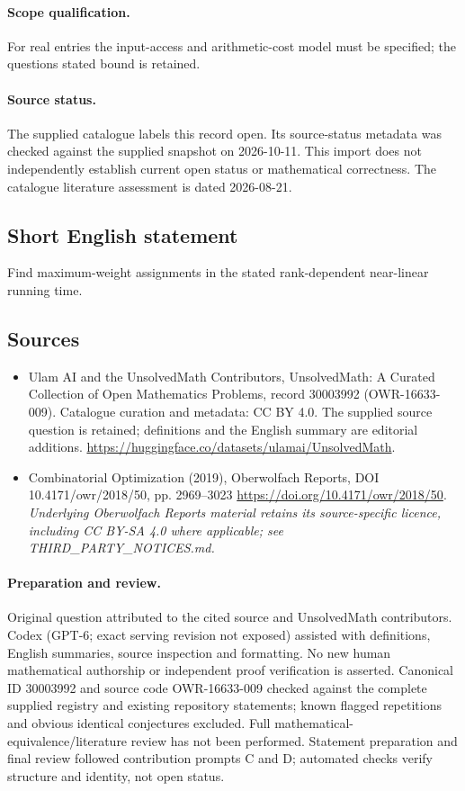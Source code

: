 \documentclass[11pt]{article}
\begin{document}
\paragraph{Scope qualification.}
For real entries the input-access and arithmetic-cost model must be specified; the question\textquotesingle s stated bound is retained.
\paragraph{Source status.}
The supplied catalogue labels this record open. Its source-status metadata was checked against the supplied snapshot on 2026-10-11. This import does not independently establish current open status or mathematical correctness. The catalogue literature assessment is dated 2026-08-21.
\subsection{Short English statement}
Find maximum-weight assignments in the stated rank-dependent near-linear running time.
\subsection{Sources}
\begin{itemize}
\item[S1] Ulam AI and the UnsolvedMath Contributors, UnsolvedMath: A Curated Collection of Open Mathematics Problems, record 30003992 (OWR-16633-009). Catalogue curation and metadata: CC BY 4.0. The supplied source question is retained; definitions and the English summary are editorial additions.
\url{https://huggingface.co/datasets/ulamai/UnsolvedMath}.
\item[S2] Combinatorial Optimization (2019), Oberwolfach Reports, DOI 10.4171/owr/2018/50, pp. 2969--3023
\url{https://doi.org/10.4171/owr/2018/50}.
\textit{Underlying Oberwolfach Reports material retains its source-specific licence, including CC BY-SA 4.0 where applicable; see THIRD\_PARTY\_NOTICES.md.}
\end{itemize}
\paragraph{Preparation and review.}
Original question attributed to the cited source and UnsolvedMath contributors. Codex (GPT-6; exact serving revision not exposed) assisted with definitions, English summaries, source inspection and formatting. No new human mathematical authorship or independent proof verification is asserted. Canonical ID 30003992 and source code OWR-16633-009 checked against the complete supplied registry and existing repository statements; known flagged repetitions and obvious identical conjectures excluded. Full mathematical-equivalence/literature review has not been performed. Statement preparation and final review followed contribution prompts C and D; automated checks verify structure and identity, not open status.
\label{end:30003992}
\end{document}
